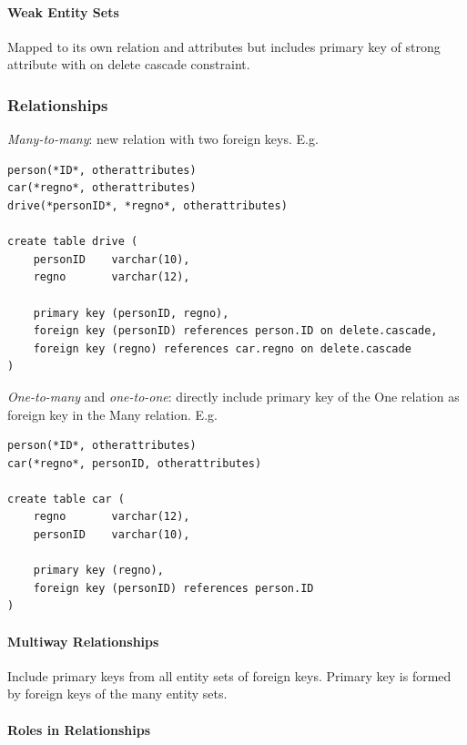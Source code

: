 \documentclass[twocolumn,english]{article}
\begin{document}
\paragraph{Weak Entity Sets}

Mapped to its own relation and attributes but includes primary key
of strong attribute with on delete cascade constraint.


\subsubsection{Relationships}

\emph{Many-to-many}: new relation with two foreign keys. E.g.

\begin{lstlisting}
person(*ID*, otherattributes)
car(*regno*, otherattributes)
drive(*personID*, *regno*, otherattributes)

create table drive (
	personID    varchar(10),
	regno       varchar(12),

	primary key (personID, regno),
	foreign key (personID) references person.ID on delete.cascade,
	foreign key (regno) references car.regno on delete.cascade
)
\end{lstlisting}


\noindent \emph{One-to-many} and \emph{one-to-one}: directly include
primary key of the One relation as foreign key in the Many relation.
E.g.

\begin{lstlisting}
person(*ID*, otherattributes)
car(*regno*, personID, otherattributes)

create table car (
	regno       varchar(12),
	personID    varchar(10),

	primary key (regno),
	foreign key (personID) references person.ID
)
\end{lstlisting}



\paragraph{Multiway Relationships}

Include primary keys from all entity sets of foreign keys. Primary
key is formed by foreign keys of the many entity sets.


\paragraph{Roles in Relationships}
\end{document}
